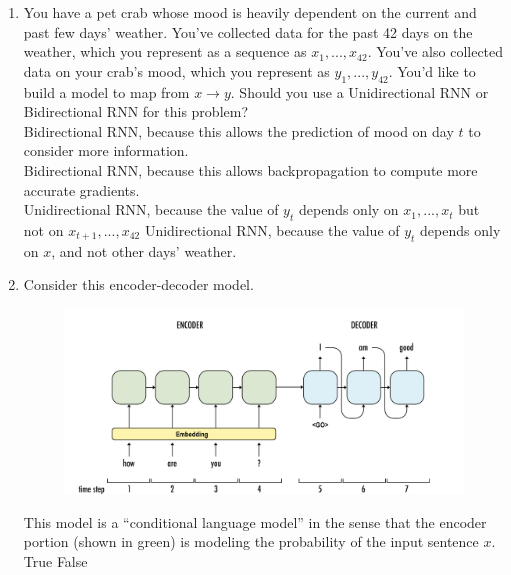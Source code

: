 \begin{enumerate}
    
    \item  You have a pet crab whose mood is heavily dependent on the current and past few days' weather. 
        You've collected data for the past 42 days on the weather, which you represent as a sequence as $x_1, ..., x_{42}$. 
        You've also collected data on your crab's mood, which you represent as $y_1, ..., y_{42}$. You’d like to build a model to map from $x \rightarrow y$. Should you use a Unidirectional RNN or Bidirectional RNN for this problem? \\ 
        \hspace{1cm}\choice{} Bidirectional RNN, because this allows the prediction of mood on day $t$ to consider more information. \\ 
        \hspace{1cm}\choice{} Bidirectional RNN, because this allows backpropagation to compute more accurate gradients. \\ 
        \hspace{1cm}\checkmark{} Unidirectional RNN, because the value of $y_t$ depends only on $x_1, ...,x_t$ but not on $x_{t+1},...,x_{42}$
        \hspace{1cm}\choice{} Unidirectional RNN, because the value of $y_t$ depends only on $x$, and not other days' weather. \\ 
        \solution{}
    \item Consider this encoder-decoder model. 
        \begin{figure}[h]
            \centering
            \includegraphics[scale=0.30]{figures/enc-dec.png}
        \end{figure}
        This model is a ``conditional language model'' in the sense that the encoder portion (shown in green) is modeling the probability of the input sentence $x$.\\
        \hspace{1cm}\choice{} True \hspace{1cm}\checkmark{} False \\

\end{enumerate}
